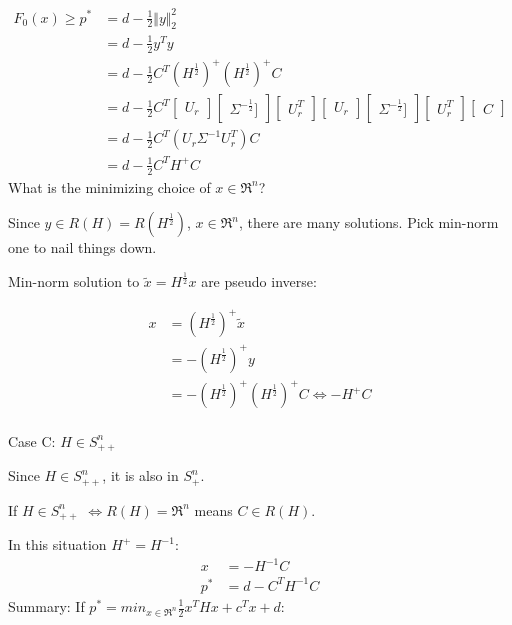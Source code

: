 \begin{align*}
F_0(x) \geq p^* &= d - \frac{1}{2}\Vert y \Vert_2^2\\
&= d - \frac{1}{2}y^Ty\\
&= d - \frac{1}{2}C^T(H^{\frac{1}{2}})^+(H^{\frac{1}{2}})^+C\\
&= d - \frac{1}{2}C^T
\begin{bmatrix}
U_r
\end{bmatrix}
\begin{bmatrix}
\Sigma^{-\frac{1}{2}}]
\end{bmatrix}
\begin{bmatrix}
U_r^T
\end{bmatrix}
\begin{bmatrix}
U_r
\end{bmatrix}
\begin{bmatrix}
\Sigma^{-\frac{1}{2}}]
\end{bmatrix}
\begin{bmatrix}
U_r^T
\end{bmatrix}
\begin{bmatrix}
C
\end{bmatrix}\\
&= d - \frac{1}{2}C^T(U_r\Sigma^{-1}U^T_r)C\\
&= d - \frac{1}{2}C^TH^+C
\end{align*}
What is the minimizing choice of $x\in \Re^n$?

Since $y\in R(H) = R(H^{\frac{1}{2}})$, $x\in \Re^n$, there are many solutions. Pick min-norm one to nail things down. 

Min-norm solution to $\tilde{x} = H^{\frac{1}{2}}x$ are pseudo inverse:

\begin{align*}
x &= (H^{\frac{1}{2}})^+\tilde{x}\\
&= -(H^{\frac{1}{2}})^+y\\
&= -(H^{\frac{1}{2}})^+(H^{\frac{1}{2}})^+C \Leftrightarrow -H^+C
\end{align*}\\

Case C: $H\in S^n_{++}$

Since $H\in S^n_{++}$, it is also in $S^n_{+}$. 

If $H\in S^n_{++}$ $\Leftrightarrow R(H) = \Re^n$ means $C \in R(H)$.

In this situation $H^+ = H^{-1}$:
\begin{align*}
x &= -H^{-1}C\\
p^* &= d - C^TH^{-1}C
\end{align*}
Summary: If $p^* = min_{x\in \Re^n}\frac{1}{2}x^THx + c^Tx + d$:

